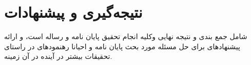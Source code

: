 \chapter{نتیجه‌گیری و پیشنهادات}
شامل جمع بندی و نتیجه نهایی وکلیه انجام تحقیق
پایان نامه و رساله است، و ارائه پیشنهادهای برای حل مسئله مورد بحث پایان نامه و احیانا رهنمودهای در
راستای تحقیقات بیشتر در آینده در آن زمینه.